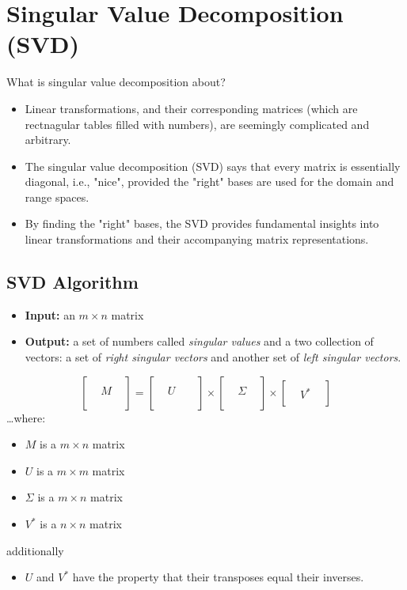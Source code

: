 \documentclass[10pt]{article}
\begin{document}
\section*{Singular Value Decomposition (SVD)}
What is singular value decomposition about?
\begin{itemize}
    \item Linear transformations, and their corresponding matrices (which are rectnagular tables filled with numbers), are seemingly complicated and arbitrary.
    \item The singular value decomposition (SVD) says that every matrix is essentially diagonal, i.e., "nice", provided the "right" bases are used for the domain and range spaces.
    \item By finding the "right" bases, the SVD provides fundamental insights into linear transformations and their accompanying matrix representations.
\end{itemize}
\subsection*{SVD Algorithm}
\begin{itemize}
    \item \textbf{Input:} an $m \times n$ matrix
    \item \textbf{Output:} a set of numbers called \textit{singular values} and a two collection of vectors: a set of \textit{right singular vectors} and another set of \textit{left singular vectors}.
\end{itemize}
\[\begin{bmatrix} & & \\ & M & \\ & & \\ & & \end{bmatrix} = \begin{bmatrix} & & & \\ & U & & \\ & & & \\ & & & \end{bmatrix} \times \begin{bmatrix} & & \\ & \Sigma & \\ & & \\ & & \end{bmatrix} \times \begin{bmatrix} & & \\ & V^* & \\ & & \end{bmatrix}\]
\dots where:
\begin{itemize}
    \item $M$ is a $m \times n$ matrix
    \item $U$ is a $m \times m$ matrix
    \item $\Sigma$ is a $m \times n$ matrix
    \item $V^*$ is a $n \times n$ matrix
\end{itemize}   
additionally
\begin{itemize}
    \item $U$ and $V^*$ have the property that their transposes equal their inverses.
\end{itemize}
\end{document}
